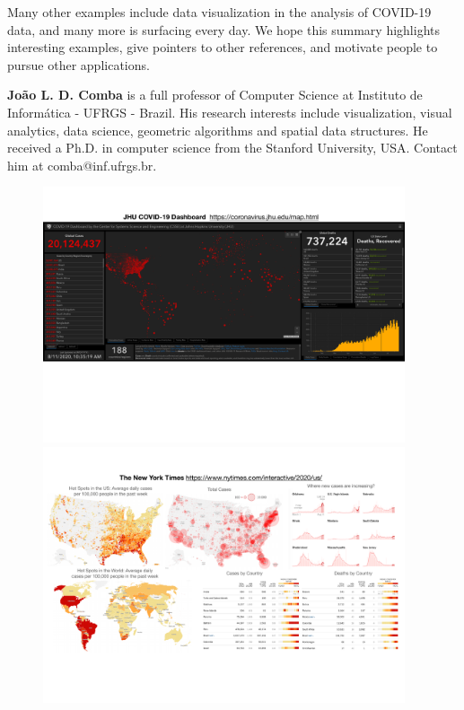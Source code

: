 \documentclass[10pt,journal,compsoc]{IEEEtran}
\newcommand{\cv}{COVID-19\xspace}
\begin{document}
Many other examples include data visualization in the analysis of \cv data, and many more is surfacing every day. We hope this summary highlights interesting examples, give pointers to other references, and motivate people to pursue other applications.

    



\bigskip

\textbf{João L. D. Comba} is a full professor of Computer Science at Instituto de Informática - UFRGS - Brazil. His research interests include visualization, visual analytics, data science, geometric algorithms and spatial data structures. He received a Ph.D. in computer science from the Stanford University, USA. Contact him at comba@inf.ufrgs.br.

\begin{figure}
	\includegraphics[width=0.95\textwidth]{figures/jhu-dashboard2.pdf}
	\includegraphics[width=0.95\textwidth]{figures/ny-times.pdf}

\end{figure}
\end{document}
